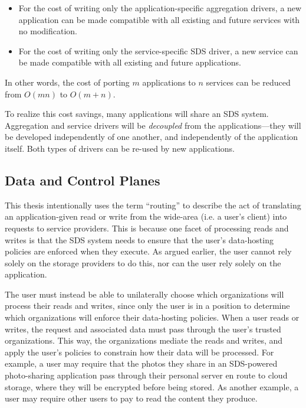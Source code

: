 \begin{itemize}
    \item For the cost of writing only the application-specific
aggregation drivers, a new application can be made
compatible with all existing and future services with no modification.
    \item For the cost of writing only the service-specific SDS driver, a new
service can be made compatible with all existing and future applications.
\end{itemize}

In other words, the cost of porting $m$ applications to $n$ services can be
reduced from $O(mn)$ to $O(m+n)$.

To realize this cost savings, many applications will share an SDS system.  Aggregation and service drivers
will be \emph{decoupled} from the applications---they will be
developed independently of one another, and independently of the
application itself.  Both types of drivers can be re-used by new applications.

\subsection{Data and Control Planes}

This thesis intentionally uses the term ``routing'' to describe the act of
translating an application-given read or write from the wide-area (i.e. a user's
client) into requests to service providers.  This is because one facet of
processing reads and writes is that the SDS system needs to ensure that
the user's data-hosting policies are enforced when they execute.
As argued earlier, the user cannot rely solely on
the storage providers to do this, nor can the user rely solely on the
application.

The user must instead be able to unilaterally choose which organizations
will process their reads and writes, since only the user is in a position to
determine which organizations will enforce their data-hosting policies.
When a user reads or writes, the request and
associated data must pass through the user's trusted organizations.  This way,
the organizations mediate the reads and writes, and apply the user's policies
to constrain how their data will be processed.  For example, a user may require
that the photos they share in an SDS-powered photo-sharing application pass
through their personal server en route to cloud storage, where they will be
encrypted before being stored.  As another example, a user may require other
users to pay to read the content they produce.

